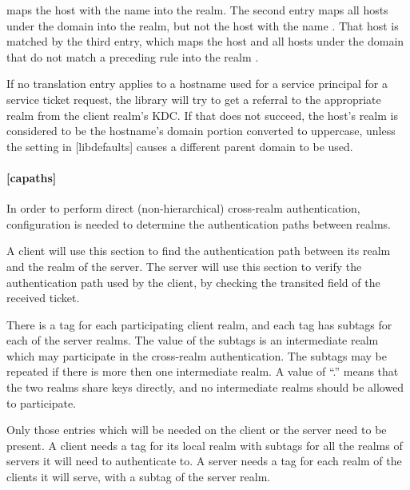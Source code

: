 \documentclass[letterpaper,10pt,english]{sphinxmanual}
\begin{document}
maps the host with the name  into the
 realm.  The second entry maps all hosts under the
domain  into the  realm, but not
the host with the name .  That host is matched
by the third entry, which maps the host  and all hosts
under the domain  that do not match a preceding rule
into the realm .

If no translation entry applies to a hostname used for a service
principal for a service ticket request, the library will try to get a
referral to the appropriate realm from the client realm’s KDC.  If
that does not succeed, the host’s realm is considered to be the
hostname’s domain portion converted to uppercase, unless the
 setting in {[}libdefaults{]} causes a different
parent domain to be used.


\paragraph{{[}capaths{]}}
\label{\detokenize{admin/conf_files/krb5_conf:id4}}\label{\detokenize{admin/conf_files/krb5_conf:capaths}}
In order to perform direct (non-hierarchical) cross-realm
authentication, configuration is needed to determine the
authentication paths between realms.

A client will use this section to find the authentication path between
its realm and the realm of the server.  The server will use this
section to verify the authentication path used by the client, by
checking the transited field of the received ticket.

There is a tag for each participating client realm, and each tag has
subtags for each of the server realms.  The value of the subtags is an
intermediate realm which may participate in the cross-realm
authentication.  The subtags may be repeated if there is more then one
intermediate realm.  A value of “.” means that the two realms share
keys directly, and no intermediate realms should be allowed to
participate.

Only those entries which will be needed on the client or the server
need to be present.  A client needs a tag for its local realm with
subtags for all the realms of servers it will need to authenticate to.
A server needs a tag for each realm of the clients it will serve, with
a subtag of the server realm.
\end{document}
